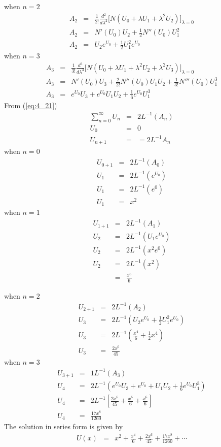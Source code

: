 \documentclass[11pt]{report}
\newcommand{\sps}{\\[0.2cm]}
\newcommand{\refn}[1]{(\ref{#1})}
\newcommand{\refx}[1]{\refn{eq:#1}}
\newcommand{\sprime}{'}
\newcommand{\dprime}{''}
\newcommand{\tprime}{'''}
\begin{document}
	when $n=2$
	\begin{eqnarray*}
		A_2 &=&\frac{1}{2!}\frac{d^2}{d\lambda^2}\Big[N (U_0 + \lambda U_1 + \lambda^2U_2)\Big]_{\lambda=0}\sps
		A_2 &=& N\sprime(U_0) U_2 + \frac{1}{2}N\dprime(U_0)U_1^2\sps
		A_2 &=& U_2e^{U_0} + \frac{1}{2}U_1^2e^{U_0}
	\end{eqnarray*}
	when $n=3$
	\begin{eqnarray*}
		A_3 &=&\frac{1}{3!}\frac{d^3}{d\lambda^3}\Big[N (U_0+ \lambda U_1 + \lambda^2U_2+\lambda^2U_3)\Big]_{\lambda=0}\sps
		A_3 &=& N\sprime(U_0)U_3 + \frac{2}{2!}N\dprime(U_0)U_1U_2 + \frac{1}{3!}N\tprime(U_0)U_1^3\sps
		A_3 &=& e^{U_0}U_3 + e^{U_0}U_1U_2 + \frac{1}{6}e^{U_0}U_1^3
	\end{eqnarray*}
	From \refx{4_21}
	\begin{eqnarray*}
		\sum_{n=0}^\infty U_n &=& 2L^{-1}(A_n)\sps
		U_0 &=& 0\sps
		U_{n+1} &=& = 2L^{-1}A_n
	\end{eqnarray*}
	when $n=0$
	\begin{eqnarray*}
		U_{0+1} &=&2L^{-1}(A_0)\sps
		U_1 &=&2L^{-1}(e^{U_0})\sps
		U_1 &=& 2L^{-1}(e^0)\sps
		U_1 &=& x^2
	\end{eqnarray*}
	when $n=1$
	\begin{eqnarray*}
		U_{1+1} &=& 2L^{-1}(A_1)\sps
		U_2 &=& 2L^{-1}(U_1e^{U_0})\sps
		U_2 &=& 2L^{-1}(x^2e^0)\sps
		U_2 &=& 2L^{-1}(x^2)\sps
		&=& \frac{x^6}{6}
	\end{eqnarray*}

	when $n=2$
	\begin{eqnarray*}
		U_{2+1} &=& 2L^{-1}(A_2)\sps
		U_3 &=& 2L^{-1}(U_2e^{U_0}+\frac{1}{2}U_1^2e^{U_0})\sps
		U_3 &=& 2L^{-1}\left(\frac{x^4}{6} + \frac{1}{2}x^4\right)\sps
		U_3 &=& \frac{2x^6}{45}
	\end{eqnarray*}
	when $n=3$
	\begin{eqnarray*}
		U_{3+1} &=& 1L^{-1}(A_3)\sps
		U_4 &=& 2L^{-1}(e^{U_0}U_3 + e^{U_0} + U_1U_2 + \frac{1}{6}e^{U_0}U_1^3)\sps
		U_4 &=&2L^{-1}\left[ \frac{2x^6}{45} + \frac{x^6}{6} + \frac{x^6}{6}  \right]\sps
		U_4 &=& \frac{17x^8}{1260}
	\end{eqnarray*}
	The solution in series form is given by
	\begin{eqnarray*}
		U(x) &=& x^2 +  \frac{x^4}{6} + \frac{2x^6}{45} + \frac{17x^8}{1260} + \cdots
	\end{eqnarray*}

	\newpage
\end{document}
